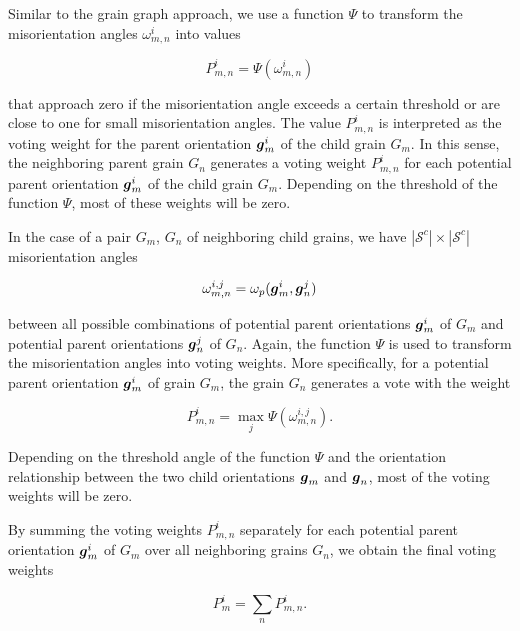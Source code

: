 \documentclass{elsarticle}
\renewcommand{\vec}[1]{\ensuremath \mathbf{\boldsymbol{#1}}}
\numberwithin{equation}{section}
\begin{document}
Similar to the grain graph approach, we use a function $\Psi$ to transform the misorientation angles $\omega_{m,n}^{i} $ into values

\begin{equation}
    \label{eq:P2}
    P_{m,n}^{i} = \Psi(\omega_{m,n}^{i})
\end{equation}

that approach zero if the misorientation angle exceeds a certain threshold or are close to one for small misorientation angles. The value $P_{m,n}^{i}$ is interpreted as the voting weight for the parent orientation $\vec g_m^i$ of the child grain $G_m$. In this sense, the neighboring parent grain $G_n$ generates a voting weight $P_{m,n}^{i}$ for each potential parent orientation $\vec g_m^i$ of the child grain $G_m$. Depending on the threshold of the function $\Psi$, most of these weights will be zero.

In the case of a pair $G_m$, $G_n$ of neighboring child grains, we have $|\mathcal S^c| \times |\mathcal S^c|$ misorientation angles

\begin{equation*}
    \omega_{m,n}^{i,j} 
    = \omega_p(\vec g_m^i,\vec g_n^j)
\end{equation*}

between all possible combinations of potential parent orientations $\vec g_m^i$ of $G_m$ and potential parent orientations $\vec g_n^j$ of $G_n$. Again, the function $\Psi$ is used to transform the misorientation angles into voting weights. More specifically, for a potential parent orientation $\vec g_m^i$ of grain $G_m$, the grain $G_n$ generates a vote with the weight 

\begin{equation*}
    P_{m,n}^{i} = \max_j \Psi(\omega_{m,n}^{i,j}).
\end{equation*}

Depending on the threshold angle of the function $\Psi$ and the orientation relationship between the two child orientations $\vec g_m$ and $\vec g_n$, most of the voting weights will be zero.

By summing the voting weights $P_{m,n}^i$ separately for each potential parent orientation $\vec g_m^i$ of $G_m$ over all neighboring grains $G_n$, we obtain the final voting weights

\begin{equation}
\label{eq:PmiVote}
  P_{m}^{i}
  = \sum\limits_{n} P_{m,n}^{i}.
\end{equation}
\end{document}
